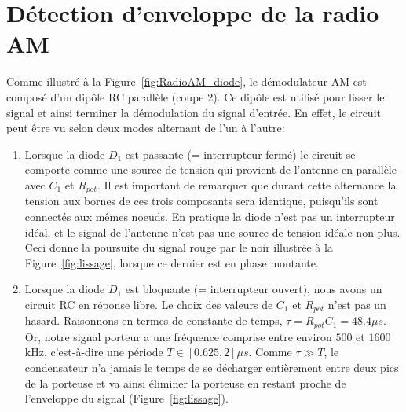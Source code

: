 \section{Détection d'enveloppe de la radio AM}
\label{demodu2}
Comme illustré à la Figure~\ref{fig:RadioAM_diode}, le démodulateur AM est 
composé d'un dipôle RC parallèle (coupe 2). Ce dipôle est utilisé pour lisser le signal 
et ainsi terminer la démodulation du signal d'entrée. En effet, le circuit 
peut être vu selon deux modes alternant de l'un à l'autre:
\begin{enumerate}
	\item Lorsque la diode $D_1$ est passante (= interrupteur fermé) 
	le circuit se comporte comme une source de tension qui provient de l'antenne en parallèle avec 
	$C_1$ et $R_{pot}$.
	Il est important de remarquer que durant cette alternance la tension aux 
	bornes de ces trois composants sera identique, puisqu'ils sont connectés 
	aux mêmes noeuds.%
	En pratique la diode n'est pas un interrupteur idéal, et le signal de l'antenne n'est pas une source de tension
	idéale non plus. Ceci donne la poursuite du signal rouge par le noir 
	illustrée à la Figure~\ref{fig:lissage}, lorsque ce dernier est en phase montante.
	\item Lorsque la diode $D_1$ est bloquante (= interrupteur ouvert), nous avons
	un circuit RC en réponse libre. Le choix des valeurs de $C_1$ et $R_{pot}$ 
	n'est pas un hasard. Raisonnons en termes de constante de temps, 
	$\tau = R_{pot} C_{1} = 48.4 {\mu s}$. 
	Or, notre signal porteur a une fréquence comprise entre environ $500$ et $1600$ 
	kHz, c'est-à-dire une période $T \in [0.625 , 2 ] {\mu s}$. 
	Comme $\tau \gg  T$, le condensateur n'a jamais le temps de se décharger
	entièrement entre deux pics de la porteuse et va ainsi éliminer la porteuse 
	en restant proche de l'enveloppe du signal (Figure~\ref{fig:lissage}). 
\end{enumerate}

